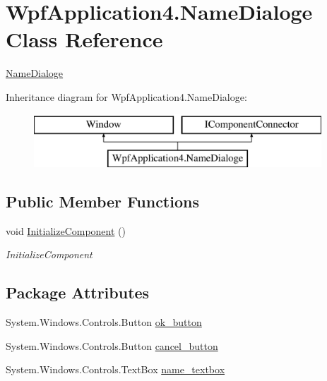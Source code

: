 \hypertarget{classWpfApplication4_1_1NameDialoge}{\section{Wpf\-Application4.\-Name\-Dialoge Class Reference}
\label{classWpfApplication4_1_1NameDialoge}
}


\hyperlink{classWpfApplication4_1_1NameDialoge}{Name\-Dialoge}  


Inheritance diagram for Wpf\-Application4.\-Name\-Dialoge\-:\begin{figure}[H]
\begin{center}
\leavevmode
\includegraphics[height=2.000000cm]{classWpfApplication4_1_1NameDialoge}
\end{center}
\end{figure}
\subsection*{Public Member Functions}
\begin{DoxyCompactItemize}
\item 
void \hyperlink{classWpfApplication4_1_1NameDialoge_a32a6262c11e6072b01a17b18c5b0107a}{Initialize\-Component} ()
\begin{DoxyCompactList}\small\item\em Initialize\-Component \end{DoxyCompactList}\end{DoxyCompactItemize}
\subsection*{Package Attributes}
\begin{DoxyCompactItemize}
\item 
System.\-Windows.\-Controls.\-Button \hyperlink{classWpfApplication4_1_1NameDialoge_a66734ab0766d633159da4b222fb5914d}{ok\-\_\-button}
\item 
System.\-Windows.\-Controls.\-Button \hyperlink{classWpfApplication4_1_1NameDialoge_a159e41148753b8f8569224df378664f0}{cancel\-\_\-button}
\item 
System.\-Windows.\-Controls.\-Text\-Box \hyperlink{classWpfApplication4_1_1NameDialoge_a9cc6d5b5dfd140e835e30b6abd20f629}{name\-\_\-textbox}
\end{DoxyCompactItemize}
